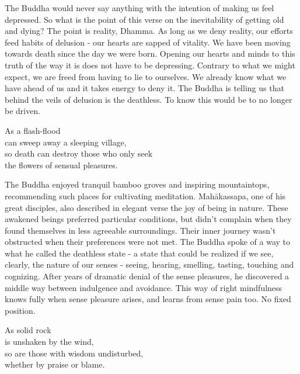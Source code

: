 \begin{dhpRefl}
The Buddha would never say anything with the intention of making us feel depressed. So what is the point of this verse on the inevitability of getting old and dying? The point is reality, Dhamma. As long as we deny reality, our efforts feed habits of delusion - our hearts are sapped of vitality. We have been moving towards death since the day we were born. Opening our hearts and minds to this truth of the way it is does not have to be depressing. Contrary to what we might expect, we are freed from having to lie to ourselves. We already know what we have ahead of us and it takes energy to deny it. The Buddha is telling us that behind the veils of delusion is the deathless. To know this would be to no longer be driven.
\end{dhpRefl}


\begin{dhpVerse}{47}
\label{dhp-47}
As a flash-flood\\
can sweep away a sleeping village,\\
so death can destroy those who only seek\\
the flowers of sensual pleasures.
\end{dhpVerse}

\begin{dhpRefl}
The Buddha enjoyed tranquil bamboo groves and inspiring mountaintops, recommending such places for cultivating meditation. Mahākassapa, one of his great disciples, also described in elegant verse the joy of being in nature. These awakened beings preferred particular conditions, but didn't complain when they found themselves in less agreeable surroundings. Their inner journey wasn't obstructed when their preferences were not met. The Buddha spoke of a way to what he called the deathless state - a state that could be realized if we see, clearly, the nature of our senses - seeing, hearing, smelling, tasting, touching and cognizing. After years of dramatic denial of the sense pleasures, he discovered a middle way between indulgence and avoidance. This way of right mindfulness knows fully when sense pleasure arises, and learns from sense pain too. No fixed position.
\end{dhpRefl}


\begin{dhpVerse}{81}
\label{dhp-81}
As solid rock\\
is unshaken by the wind,\\
so are those with wisdom undisturbed,\\
whether by praise or blame.
\end{dhpVerse}

